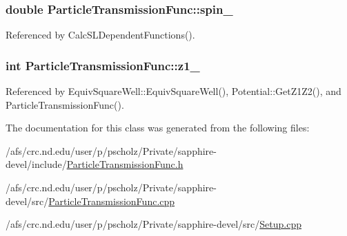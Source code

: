 \hypertarget{classParticleTransmissionFunc_a3143aef2c113158fca1643a2505f0b9a}{
\subsubsection[{spin\-\_\-}]{\setlength{\rightskip}{0pt plus 5cm}double Particle\-Transmission\-Func\-::spin\-\_\-\hspace{0.3cm}{\ttfamily [protected]}}}\label{classParticleTransmissionFunc_a3143aef2c113158fca1643a2505f0b9a}


Referenced by Calc\-S\-L\-Dependent\-Functions().

\hypertarget{classParticleTransmissionFunc_a4c11b86051f613e37b10c692ea9746ce}{
\subsubsection[{z1\-\_\-}]{\setlength{\rightskip}{0pt plus 5cm}int Particle\-Transmission\-Func\-::z1\-\_\-\hspace{0.3cm}{\ttfamily [protected]}}}\label{classParticleTransmissionFunc_a4c11b86051f613e37b10c692ea9746ce}


Referenced by Equiv\-Square\-Well\-::\-Equiv\-Square\-Well(), Potential\-::\-Get\-Z1\-Z2(), and Particle\-Transmission\-Func().



The documentation for this class was generated from the following files\-:\begin{DoxyCompactItemize}
\item 
/afs/crc.\-nd.\-edu/user/p/pscholz/\-Private/sapphire-\/devel/include/\hyperlink{ParticleTransmissionFunc_8h}{Particle\-Transmission\-Func.\-h}\item 
/afs/crc.\-nd.\-edu/user/p/pscholz/\-Private/sapphire-\/devel/src/\hyperlink{ParticleTransmissionFunc_8cpp}{Particle\-Transmission\-Func.\-cpp}\item 
/afs/crc.\-nd.\-edu/user/p/pscholz/\-Private/sapphire-\/devel/src/\hyperlink{Setup_8cpp}{Setup.\-cpp}\end{DoxyCompactItemize}
